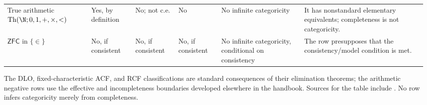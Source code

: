 \begin{landscape}
\begin{longtable}{@{}p{1.15in}p{1.05in}p{.62in}p{.65in}p{.95in}p{2.64in}@{}}
\addlinespace
True arithmetic \(\operatorname{Th}(\N;0,1,+,\times,<)\) & Yes, by definition & No; not c.e. & No & No infinite categoricity & It has nonstandard elementary equivalents; completeness is not categoricity. \\
\addlinespace
\(\mathsf{ZFC}\) in \(\{\in\}\) & No, if consistent & No, if consistent & No, if consistent & No infinite categoricity, conditional on consistency & The row presupposes that the consistency/model condition is met. \\
\bottomrule
\end{longtable}
\endgroup
\end{landscape}

The DLO, fixed-characteristic ACF, and RCF classifications are standard
consequences of their elimination theorems; the arithmetic negative rows use
the effective and incompleteness boundaries developed elsewhere in the
handbook.  Sources for the table include
  \cite{Marker2002,Steinitz1910,Hodges1993,Presburger1929,Shoenfield1967,Godel1931,
FerranteRackoff1979,Kozen1980}.  No row infers categoricity merely from
completeness.


